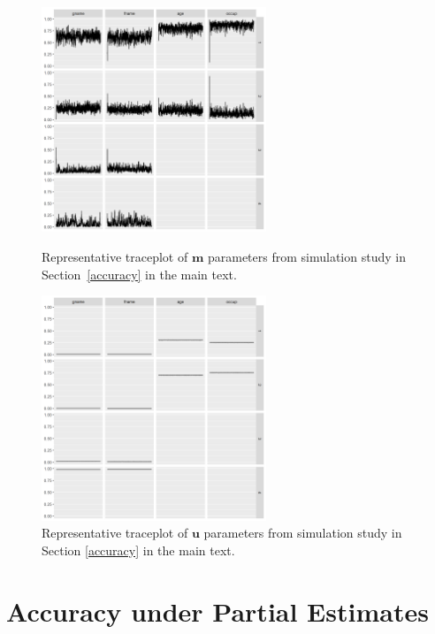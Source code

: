 \documentclass[ba,preprint]{imsart}
\begin{document}
	
	\begin{figure}
		\begin{center}
			\includegraphics[width=0.6\textwidth]{../notes/figures/sim_m_trace} 
			\caption{Representative traceplot of $\bm{m}$ parameters from simulation study in Section~\ref{accuracy} in the main text.}\label{fig:sim_m_trace}
		\end{center}

		\begin{center}
			\includegraphics[width=0.6\textwidth]{../notes/figures/sim_u_trace} 
			\caption{Representative traceplot of $\bm{u}$ parameters from simulation study in Section \ref{accuracy} in the main text.}\label{fig:sim_u_trace}
		\end{center}
	\end{figure}

\clearpage

	\hypertarget{partial}{%
	\section{Accuracy under Partial Estimates}\label{partial}}
\end{document}
